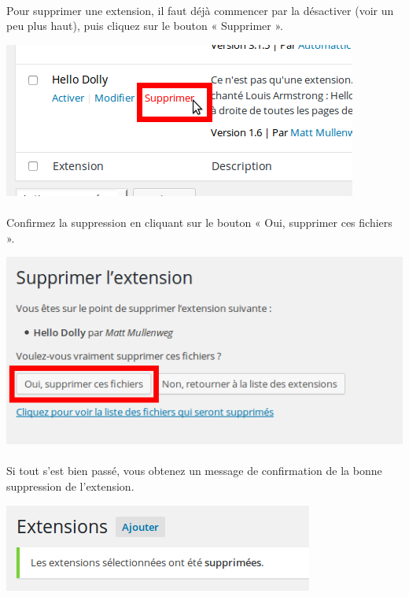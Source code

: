 \documentclass[10pt,a4paper]{article}
\begin{document}
\paragraph{}Pour supprimer une extension, il faut déjà commencer par la désactiver (voir un peu plus haut), puis cliquez sur le bouton « Supprimer ».
\begin{center}
\includegraphics[scale=0.3]{img/0167.png}
\end{center}
\paragraph{}Confirmez la suppression en cliquant sur le bouton « Oui, supprimer ces fichiers ».
\begin{center}
\includegraphics[scale=0.3]{img/0168.png}
\end{center}
\paragraph{}Si tout s'est bien passé, vous obtenez un message de confirmation de la bonne suppression de l'extension.
\begin{center}
\includegraphics[scale=0.3]{img/0169.png}
\end{center}
\newpage
\end{document}
